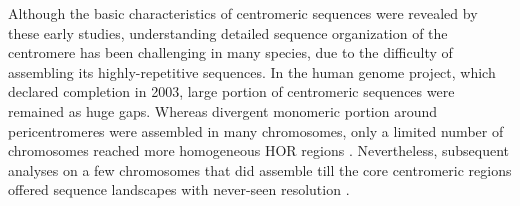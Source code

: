 Although the basic characteristics of centromeric sequences were revealed by these early studies, understanding detailed sequence organization of the centromere has been challenging in many species, due to the difficulty of assembling its highly-repetitive sequences. In the human genome project, which declared completion in 2003, large portion of centromeric sequences were remained as huge gaps. Whereas divergent monomeric portion around pericentromeres were assembled in many chromosomes, only a limited number of chromosomes reached more homogeneous HOR regions \cite{M.KatharineRuddand2004, She2004}. Nevertheless, subsequent analyses on a few chromosomes that did assemble till the core centromeric regions offered sequence landscapes with never-seen resolution \cite{Schueler2001, Ross2005, Nusbaum2006, Rudd2006}.
